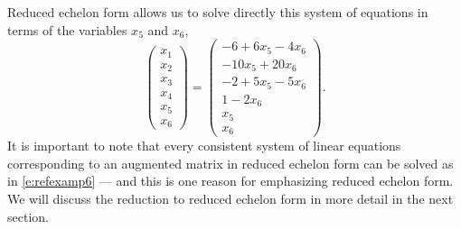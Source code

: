 \documentclass{ximera}
\begin{document}
Reduced echelon form allows us to solve directly this system of
equations in terms of the variables $x_5$ and $x_6$,
\begin{equation}  \label{e:refexamp6}
\left(\begin{array}{c} x_1\\x_2\\x_3\\x_4\\x_5\\x_6\end{array}\right) =
\left(\begin{array}{c} -6+6x_5-4x_6\\-10x_5+20x_6\\
-2+5x_5-5x_6\\1-2x_6\\x_5\\x_6\end{array}\right).
\end{equation}
It is important to note that every consistent system of linear equations
corresponding to an augmented matrix in reduced echelon form can be
solved as in \eqref{e:refexamp6} --- and this is one reason for emphasizing
reduced echelon form.  We will discuss the reduction to reduced echelon
form in more detail in the next section.

\EXER


\TEXER
\end{document}
